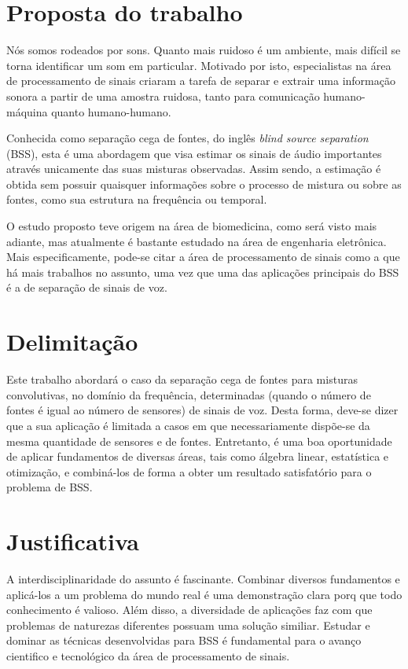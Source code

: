 \section{Proposta do trabalho}

Nós somos rodeados por sons. Quanto mais ruidoso é um ambiente, mais difícil se torna identificar um som em particular. Motivado por isto, especialistas na área de processamento de sinais criaram a tarefa de separar e extrair uma informação sonora a partir de uma amostra ruidosa, tanto para comunicação humano-máquina quanto humano-humano. 

Conhecida como separação cega de fontes, do inglês \textit{blind source separation} (BSS), esta é uma abordagem que visa estimar os sinais de áudio importantes através unicamente das suas misturas observadas. Assim sendo, a estimação é obtida sem possuir quaisquer informações sobre o processo de mistura ou sobre as fontes, como sua estrutura na frequência ou temporal.

O estudo proposto teve origem na área de biomedicina, como será visto mais adiante, mas atualmente é bastante estudado na área de engenharia eletrônica. Mais especificamente, pode-se citar a área de processamento de sinais como a que há mais trabalhos no assunto, uma vez que uma das aplicações principais do BSS é a de separação de sinais de voz.

\section{Delimitação}

Este trabalho abordará o caso da separação cega de fontes para misturas convolutivas, no domínio da frequência, determinadas (quando o número de fontes é igual ao número de sensores) de sinais de voz. Desta forma, deve-se dizer que a sua aplicação é limitada a casos em que necessariamente dispõe-se da mesma quantidade de sensores e de fontes. Entretanto, é uma boa oportunidade de aplicar fundamentos de diversas áreas, tais como álgebra linear, estatística e otimização, e combiná-los de forma a obter um resultado satisfatório para o problema de BSS.


\section{Justificativa}

A interdisciplinaridade do assunto é fascinante. Combinar diversos fundamentos e aplicá-los a um problema do mundo real é uma demonstração clara porq que todo conhecimento é valioso. Além disso, a diversidade de aplicações faz com que problemas de naturezas diferentes possuam uma solução similiar. Estudar e dominar as técnicas desenvolvidas para BSS é fundamental para o avanço cientifico e tecnológico da área de processamento de sinais.


